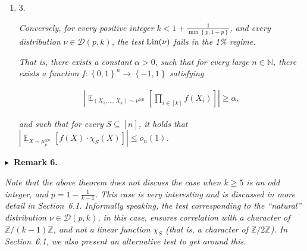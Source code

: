 \documentclass[10pt,a4paper]{article}
\begin{document}
\begin{enumerate}
\item[] 
3. 


\emph{Conversely, for every positive integer }$k<1+\frac{1}{\min\left\{p,1-p\right\}}$\emph{, and every distribution }$\nu\in\mathcal{D}(p,k)$\emph{, the test }$\textnormal{Lin}(\nu)$\emph{ fails in the 1\% regime.}\par




\emph{That is, there exists a constant }$\alpha>0$\emph{, such that for every large }$n\in\mathbb{N}$\emph{, there exists a function }$f:\left\{0,1\right\}^{n}\to\left\{-1,1\right\}$\emph{ satisfying}\par


\[\begin{gathered}
\left|\mathop{\mathbb{E}}_{(X_{1},\dots,X_{k})\sim\nu^{\otimes n}}\left[\prod_{i\in[k]}f(X_{i})\right]\right|\geqslant\alpha,
\end{gathered}\]


\emph{and such that for every }$S\subseteq[n]$\emph{, it holds that }$\left|\mathop{\mathbb{E}}_{X\sim\mu_{p}^{\otimes n}}\left[f(X)\cdot\chi_{S}(X)\right]\right|\leqslant o_{n}(1)$\emph{.}\par





\end{enumerate}








\par\medskip\noindent\textbf{
$\blacktriangleright$ Remark 6.
}\par



\emph{Note that the above theorem does not discuss the case when $k\geqslant 5$ is an odd integer, and $p=1-\frac{1}{k-1}$.
This case is very interesting and is discussed in more detail in Section 6.1.
Informally speaking, the test corresponding to the “natural” distribution $\nu\in\mathcal{D}(p,k)$, in this case, ensures correlation with a character of $\mathbb{Z}/(k-1)\mathbb{Z}$, and not a linear function $\chi_{S}$ (that is, a character of $\mathbb{Z}/2\mathbb{Z}$).
In Section 6.1, we also present an alternative test to get around this.}\par



\end{document}
